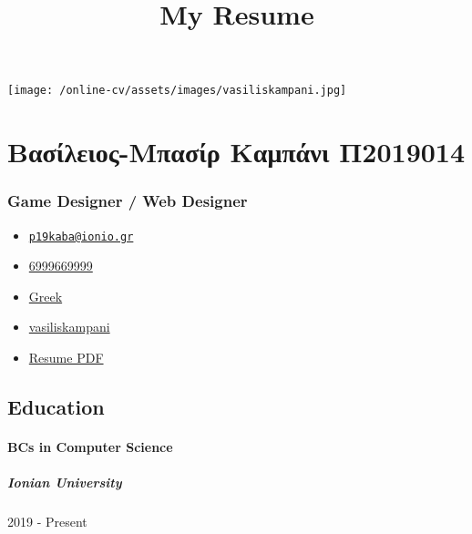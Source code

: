 \documentclass[english,]{article}
\title{My Resume}
\date{}
\providecommand{\tightlist}{%
  \setlength{\itemsep}{0pt}\setlength{\parskip}{0pt}}
\let\oldparagraph\paragraph
\renewcommand{\paragraph}[1]{\oldparagraph{#1}\mbox{}}
\let\oldsubparagraph\subparagraph
\renewcommand{\subparagraph}[1]{\oldsubparagraph{#1}\mbox{}}
\begin{document}
\maketitle

\texttt{[image: /online-cv/assets/images/vasiliskampani.jpg]}

\hypertarget{ux3b2ux3b1ux3c3ux3afux3bbux3b5ux3b9ux3bfux3c2-ux3bcux3c0ux3b1ux3c3ux3afux3c1-ux3baux3b1ux3bcux3c0ux3acux3bdux3b9-ux3c02019014}{%
\section{Βασίλειος-Μπασίρ Καμπάνι
Π2019014}\label{ux3b2ux3b1ux3c3ux3afux3bbux3b5ux3b9ux3bfux3c2-ux3bcux3c0ux3b1ux3c3ux3afux3c1-ux3baux3b1ux3bcux3c0ux3acux3bdux3b9-ux3c02019014}}

\hypertarget{game-designer-web-designer}{%
\subsubsection{Game Designer / Web
Designer}\label{game-designer-web-designer}}

\begin{itemize}
\tightlist
\item
  \emph{} \href{mailto:p19kaba@ionio.gr}{\nolinkurl{p19kaba@ionio.gr}}
\item
  \emph{} \href{tel:6999669999}{6999669999}
\item
  \emph{} \href{}{Greek}
\item
  \emph{} \href{http://github.com/vasiliskampani}{vasiliskampani}
\item
  \emph{} \href{http://www.africau.edu/images/default/sample.pdf}{Resume
  PDF}
\end{itemize}

\hypertarget{education}{%
\subsection{Education}\label{education}}

\hypertarget{bcs-in-computer-science}{%
\paragraph{BCs in Computer Science}\label{bcs-in-computer-science}}

\hypertarget{ionian-university}{%
\subparagraph{Ionian University}\label{ionian-university}}

2019 - Present
\end{document}
